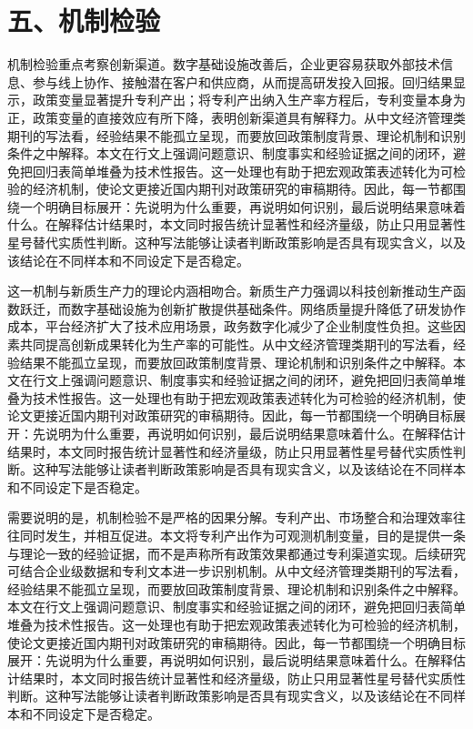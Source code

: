 \documentclass[12pt,a4paper]{article}
\begin{document}
\section*{五、机制检验}
机制检验重点考察创新渠道。数字基础设施改善后，企业更容易获取外部技术信息、参与线上协作、接触潜在客户和供应商，从而提高研发投入回报。回归结果显示，政策变量显著提升专利产出；将专利产出纳入生产率方程后，专利变量本身为正，政策变量的直接效应有所下降，表明创新渠道具有解释力。从中文经济管理类期刊的写法看，经验结果不能孤立呈现，而要放回政策制度背景、理论机制和识别条件之中解释。本文在行文上强调问题意识、制度事实和经验证据之间的闭环，避免把回归表简单堆叠为技术性报告。这一处理也有助于把宏观政策表述转化为可检验的经济机制，使论文更接近国内期刊对政策研究的审稿期待。因此，每一节都围绕一个明确目标展开：先说明为什么重要，再说明如何识别，最后说明结果意味着什么。在解释估计结果时，本文同时报告统计显著性和经济量级，防止只用显著性星号替代实质性判断。这种写法能够让读者判断政策影响是否具有现实含义，以及该结论在不同样本和不同设定下是否稳定。

这一机制与新质生产力的理论内涵相吻合。新质生产力强调以科技创新推动生产函数跃迁，而数字基础设施为创新扩散提供基础条件。网络质量提升降低了研发协作成本，平台经济扩大了技术应用场景，政务数字化减少了企业制度性负担。这些因素共同提高创新成果转化为生产率的可能性。从中文经济管理类期刊的写法看，经验结果不能孤立呈现，而要放回政策制度背景、理论机制和识别条件之中解释。本文在行文上强调问题意识、制度事实和经验证据之间的闭环，避免把回归表简单堆叠为技术性报告。这一处理也有助于把宏观政策表述转化为可检验的经济机制，使论文更接近国内期刊对政策研究的审稿期待。因此，每一节都围绕一个明确目标展开：先说明为什么重要，再说明如何识别，最后说明结果意味着什么。在解释估计结果时，本文同时报告统计显著性和经济量级，防止只用显著性星号替代实质性判断。这种写法能够让读者判断政策影响是否具有现实含义，以及该结论在不同样本和不同设定下是否稳定。

需要说明的是，机制检验不是严格的因果分解。专利产出、市场整合和治理效率往往同时发生，并相互促进。本文将专利产出作为可观测机制变量，目的是提供一条与理论一致的经验证据，而不是声称所有政策效果都通过专利渠道实现。后续研究可结合企业级数据和专利文本进一步识别机制。从中文经济管理类期刊的写法看，经验结果不能孤立呈现，而要放回政策制度背景、理论机制和识别条件之中解释。本文在行文上强调问题意识、制度事实和经验证据之间的闭环，避免把回归表简单堆叠为技术性报告。这一处理也有助于把宏观政策表述转化为可检验的经济机制，使论文更接近国内期刊对政策研究的审稿期待。因此，每一节都围绕一个明确目标展开：先说明为什么重要，再说明如何识别，最后说明结果意味着什么。在解释估计结果时，本文同时报告统计显著性和经济量级，防止只用显著性星号替代实质性判断。这种写法能够让读者判断政策影响是否具有现实含义，以及该结论在不同样本和不同设定下是否稳定。
\end{document}
